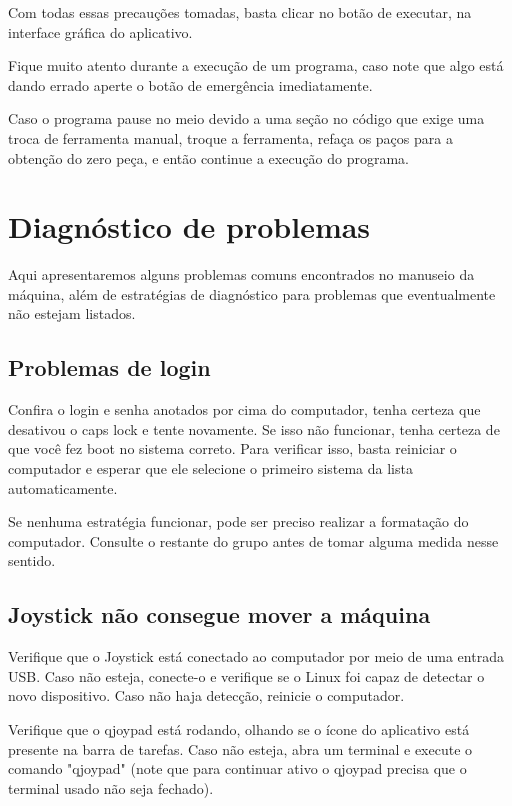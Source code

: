 \documentclass[twoside,a4paper]{refart}
\begin{document}
Com todas essas precauções tomadas, basta clicar no botão de executar, na interface gráfica do aplicativo. 

\attention Fique muito atento durante a execução de um programa, caso note que algo está dando errado aperte o botão de emergência imediatamente.

\attention Caso o programa pause no meio devido a uma seção no código que exige uma troca de ferramenta manual, troque a ferramenta, refaça os paços para a obtenção do zero peça, e então continue a execução do programa.  

\section{Diagnóstico de problemas}

Aqui apresentaremos alguns problemas comuns encontrados no manuseio da máquina, além de estratégias de diagnóstico para problemas que eventualmente não estejam listados.

\subsection{Problemas de login}

Confira o login e senha anotados por cima do computador, tenha certeza que desativou o caps lock e tente novamente. Se isso não funcionar, tenha certeza de que você fez boot no sistema correto. Para verificar isso, basta reiniciar o computador e esperar que ele selecione o primeiro sistema da lista automaticamente. 

Se nenhuma estratégia funcionar, pode ser preciso realizar a formatação do computador. Consulte o restante do grupo antes de tomar alguma medida nesse sentido.

\subsection{Joystick não consegue mover a máquina}

Verifique que o Joystick está conectado ao computador por meio de uma entrada USB. Caso não esteja, conecte-o e verifique se o Linux foi capaz de detectar o novo dispositivo. Caso não haja detecção, reinicie o computador. 

Verifique que o qjoypad está rodando, olhando se o ícone do aplicativo está presente na barra de tarefas. Caso não esteja, abra um terminal e execute o comando "qjoypad" (note que para continuar ativo o qjoypad precisa que o terminal usado não seja fechado).
\end{document}
